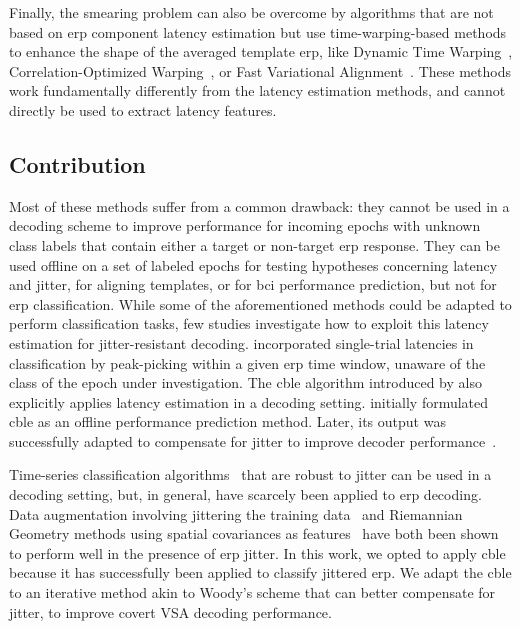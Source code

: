 Finally, the smearing problem can also be overcome by algorithms that are not
based on \ac{erp} component latency estimation but use time-warping-based methods
to enhance the shape of the averaged template \ac{erp}, like Dynamic Time
Warping~\cite{Gupta1996, Wang2001, Zoumpoulaki2015}, Correlation-Optimized
Warping~\cite{Skov2006}, or Fast Variational
Alignment~\cite{Flotho2021}.
These methods work
fundamentally differently from the latency estimation methods, and cannot
directly be used to extract latency features.

\subsection{Contribution}
\label{sec:wcble/literature/contrib}

Most of these methods suffer from a common drawback: they cannot be used in a
decoding scheme to improve performance for incoming epochs with unknown
class labels that contain either a target or non-target \ac{erp} response.
They can be used offline on a set of labeled epochs for testing hypotheses
concerning latency and jitter, for aligning templates, or for \ac{bci} performance
prediction, but not for \ac{erp} classification.
While some of the aforementioned methods could be adapted to perform
classification tasks, few studies investigate how to exploit this latency estimation
for jitter-resistant decoding.
\textcite{Hardiansyah2020} incorporated single-trial latencies in
classification by peak-picking within a given
\ac{erp} time window, unaware of the class of the epoch under investigation.
The \ac{cble} algorithm introduced
by \textcite{Thompson2012} also explicitly applies latency estimation in a
decoding setting.
\textcite{Thompson2012} initially formulated \ac{cble} as an offline performance
prediction method.
Later, its output was successfully adapted to compensate for jitter to improve
decoder performance~\cite{Mowla2017, Zisk2022}.

Time-series classification algorithms~\cite{Abanda2019}
that are robust to jitter can be used in a decoding setting,
but, in general, have scarcely been applied to \ac{erp} decoding.
Data augmentation involving jittering the training
data~\cite{Krell2018, Zisk2022} and Riemannian Geometry methods using spatial
covariances as features~\cite{Aydarkhanov2020} have both been shown
to perform well in the presence of \ac{erp} jitter.
In this work, we opted to apply \ac{cble} because it has successfully been applied to
classify jittered \acs{erp}.
We adapt the \ac{cble} to an iterative method akin to Woody's scheme that can better
compensate for jitter, to improve covert VSA decoding performance.


